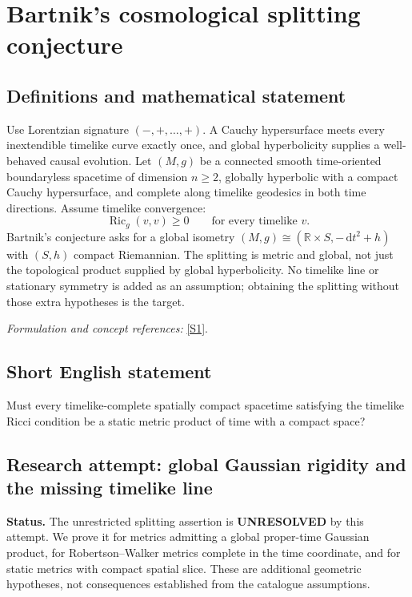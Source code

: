 \documentclass[11pt]{article}
\begin{document}
\section*{\texorpdfstring{Bartnik's cosmological splitting conjecture}{Bartnik's cosmological splitting conjecture}}\label{statement}
\subsection{Definitions and mathematical statement}
Use Lorentzian signature $(-,+,\ldots,+)$. A Cauchy hypersurface meets every inextendible timelike curve exactly once, and global hyperbolicity supplies a well-behaved causal evolution. Let $(M,g)$ be a connected smooth time-oriented boundaryless spacetime of dimension $n\ge2$, globally hyperbolic with a compact Cauchy hypersurface, and complete along timelike geodesics in both time directions. Assume timelike convergence:
\[
 \operatorname{Ric}_g(v,v)\ge0\qquad\text{for every timelike }v.
\]
Bartnik's conjecture asks for a global isometry $(M,g)\cong({\mathbb{R}}\times S,-{\,\mathrm{d}} t^2+h)$ with $(S,h)$ compact Riemannian. The splitting is metric and global, not just the topological product supplied by global hyperbolicity. No timelike line or stationary symmetry is added as an assumption; obtaining the splitting without those extra hypotheses is the target.
\par\smallskip\textit{Formulation and concept references:} \href{https://arxiv.org/html/1810.03183v2}{[S1]}.

\subsection{Short English statement}
Must every timelike-complete spatially compact spacetime satisfying the timelike Ricci condition be a static metric product of time with a compact space?
\subsection{Research attempt: global Gaussian rigidity and the missing timelike line}
\textbf{Status.} The unrestricted splitting assertion is \textbf{UNRESOLVED} by this attempt. We prove it for metrics admitting a global proper-time Gaussian product, for Robertson--Walker metrics complete in the time coordinate, and for static metrics with compact spatial slice. These are additional geometric hypotheses, not consequences established from the catalogue assumptions.
\end{document}
